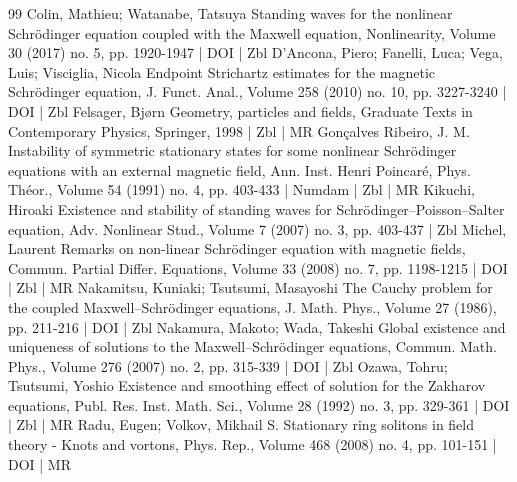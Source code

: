 \begin{thebibliography}{99}
Colin, Mathieu; Watanabe, Tatsuya Standing waves for the nonlinear Schrödinger equation coupled with the Maxwell equation, Nonlinearity, Volume 30 (2017) no. 5, pp. 1920-1947 | DOI | Zbl
D’Ancona, Piero; Fanelli, Luca; Vega, Luis; Visciglia, Nicola Endpoint Strichartz estimates for the magnetic Schrödinger equation, J. Funct. Anal., Volume 258 (2010) no. 10, pp. 3227-3240 | DOI | Zbl
Felsager, Bjørn Geometry, particles and fields, Graduate Texts in Contemporary Physics, Springer, 1998 | Zbl | MR
Gonçalves Ribeiro, J. M. Instability of symmetric stationary states for some nonlinear Schrödinger equations with an external magnetic field, Ann. Inst. Henri Poincaré, Phys. Théor., Volume 54 (1991) no. 4, pp. 403-433 | Numdam | Zbl | MR
Kikuchi, Hiroaki Existence and stability of standing waves for Schrödinger–Poisson–Salter equation, Adv. Nonlinear Stud., Volume 7 (2007) no. 3, pp. 403-437 | Zbl
Michel, Laurent Remarks on non-linear Schrödinger equation with magnetic fields, Commun. Partial Differ. Equations, Volume 33 (2008) no. 7, pp. 1198-1215 | DOI | Zbl | MR
Nakamitsu, Kuniaki; Tsutsumi, Masayoshi The Cauchy problem for the coupled Maxwell–Schrödinger equations, J. Math. Phys., Volume 27 (1986), pp. 211-216 | DOI | Zbl
Nakamura, Makoto; Wada, Takeshi Global existence and uniqueness of solutions to the Maxwell–Schrödinger equations, Commun. Math. Phys., Volume 276 (2007) no. 2, pp. 315-339 | DOI | Zbl
Ozawa, Tohru; Tsutsumi, Yoshio Existence and smoothing effect of solution for the Zakharov equations, Publ. Res. Inst. Math. Sci., Volume 28 (1992) no. 3, pp. 329-361 | DOI | Zbl | MR
Radu, Eugen; Volkov, Mikhail S. Stationary ring solitons in field theory - Knots and vortons, Phys. Rep., Volume 468 (2008) no. 4, pp. 101-151 | DOI | MR
\end{thebibliography}
